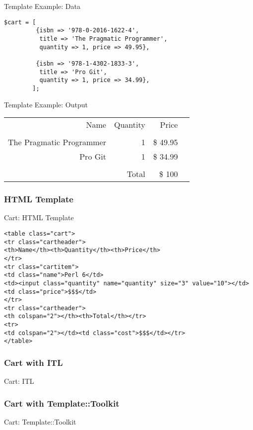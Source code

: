 \begin{frame}[fragile]{Template Example: Data}
\begin{lstlisting}
$cart = [
         {isbn => '978-0-2016-1622-4', 
          title => 'The Pragmatic Programmer',
          quantity => 1, price => 49.95},

         {isbn => '978-1-4302-1833-3',
          title => 'Pro Git',
          quantity => 1, price => 34.99},
		];
\end{lstlisting}
\end{frame}

\begin{frame}{Template Example: Output}
\begin{tabular}[t]{rrrr}
\hfill Name & Quantity & Price \\
\hfill & & \\
\hfill The Pragmatic Programmer & 1 & \$ 49.95 \\
\hfill Pro Git & 1 & \$ 34.99 \\
\hfill & & \\
\hfill & Total & \$ 100
\end{tabular}
\end{frame}

\subsubsection{HTML Template}
\begin{frame}[fragile]{Cart: HTML Template}
\begin{lstlisting}
<table class="cart">
<tr class="cartheader">
<th>Name</th><th>Quantity</th><th>Price</th>
</tr>
<tr class="cartitem">
<td class="name">Perl 6</td>
<td><input class="quantity" name="quantity" size="3" value="10"></td>
<td class="price">$$$</td>
</tr>
<tr class="cartheader">
<th colspan="2"></th><th>Total</th></tr>
<tr>
<td colspan="2"></td><td class="cost">$$$</td></tr>
</table>
\end{lstlisting}
\end{frame}
\subsubsection{Cart with ITL}
\begin{frame}[fragile]{Cart: ITL}

\end{frame}
\subsubsection{Cart with Template::Toolkit}
\begin{frame}[fragile]{Cart: Template::Toolkit}

\end{frame}
